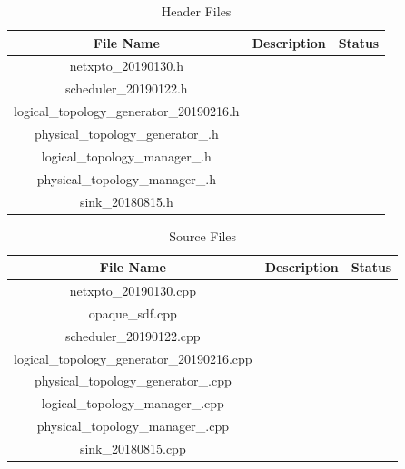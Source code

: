 \begin{table}[H]
	\centering
	\begin{tabular}{| c | c | c |}
		\hline
		\textbf{File Name}                        & \textbf{Description} & Status\\ \hline
		netxpto\_20190130.h                       &                      &       \\ \hline
		scheduler\_20190122.h                     &                      &       \\ \hline
		logical\_topology\_generator\_20190216.h  &                      &       \\ \hline
		physical\_topology\_generator\_.h         &                      &       \\ \hline
		logical\_topology\_manager\_.h    		  &                      &       \\ \hline
		physical\_topology\_manager\_.h 		  &                      &       \\ \hline
		sink\_20180815.h                          &                      &       \\ \hline
	\end{tabular}
	\caption{Header Files}
	\label{header_files}
\end{table}

\begin{table}[H]
	\centering
	\begin{tabular}{| c | c | c |}
		\hline
		\textbf{File Name}                          & \textbf{Description} & Status\\ \hline
		netxpto\_20190130.cpp                       &                      &       \\ \hline
		opaque\_sdf.cpp                             &                      &       \\ \hline
		scheduler\_20190122.cpp                     &                      &       \\ \hline
		logical\_topology\_generator\_20190216.cpp  &                      &       \\ \hline
		physical\_topology\_generator\_.cpp         &                      &       \\ \hline
		logical\_topology\_manager\_.cpp    	    &                      &       \\ \hline
		physical\_topology\_manager\_.cpp 		    &                      &       \\ \hline
		sink\_20180815.cpp                          &                      &       \\ \hline
	\end{tabular}
	\caption{Source Files}
	\label{source_files}
\end{table}

